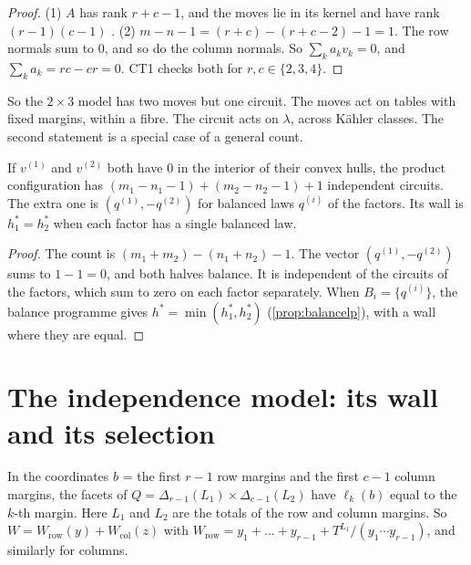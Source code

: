 \documentclass[11pt]{article}
\theoremstyle{definition}\newtheorem{definition}[theorem]{Definition}\newtheorem{remark}[theorem]{Remark}\newtheorem{example}[theorem]{Example}\newtheorem{problem}[theorem]{Open problem}\crefname{problem}{Problem}{Problems}
\begin{document}
\begin{proof}
(1) $A$ has rank $r+c-1$, and the moves lie in its kernel and have rank $(r-1)(c-1)$ \cite{DiaconisSturmfels1998}. (2) $m-n-1=(r+c)-(r+c-2)-1=1$. The row normals sum to $0$, and
so do the column normals. So $\sum_ka_kv_k=0$, and $\sum_ka_k=rc-cr=0$. CT1 checks both for $r,c\in\{2,3,4\}$.
\end{proof}

So the $2\times3$ model has two moves but one circuit. The moves act on tables with fixed margins, within a fibre. The circuit acts on
$\lambda$, across K\"ahler classes. The second statement is a special case of a general count.

\begin{proposition}\label{prop:product}
If $v^{(1)}$ and $v^{(2)}$ both have $0$ in the interior of their convex hulls, the product configuration has $(m_1-n_1-1)+(m_2-n_2-1)+1$ independent circuits. The extra
one is $(q^{(1)},-q^{(2)})$ for balanced laws $q^{(i)}$ of the factors. Its wall is $h^*_1=h^*_2$ when each factor has a single balanced law.
\end{proposition}

\begin{proof}
The count is $(m_1+m_2)-(n_1+n_2)-1$. The vector $(q^{(1)},-q^{(2)})$ sums to $1-1=0$, and both halves balance. It is independent of the circuits of the factors,
which sum to zero on each factor separately. When $B_i=\{q^{(i)}\}$, the balance programme gives $h^*=\min(h_1^*,h_2^*)$ (\cref{prop:balancelp}), with a wall where they are equal.
\end{proof}

\section{The independence model: its wall and its selection}\label{sec:indep}
In the coordinates $b$ = the first $r-1$ row margins and the first $c-1$ column margins, the facets of $Q=\Delta_{r-1}(L_1)\times\Delta_{c-1}(L_2)$ have $\ell_k(b)$ equal to the $k$-th
margin. Here $L_1$ and $L_2$ are the totals of the row and column margins. So $W=W_{\mathrm{row}}(y)+W_{\mathrm{col}}(z)$ with $W_{\mathrm{row}}=y_1+\dots+y_{r-1}+T^{L_1}/(y_1\cdots y_{r-1})$, and similarly for columns.
\end{document}
